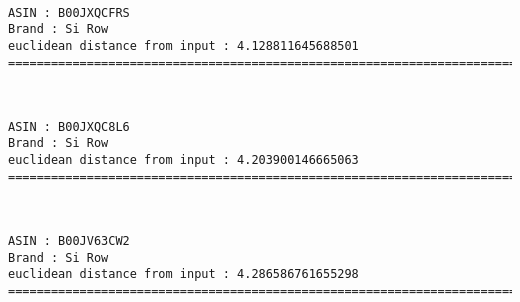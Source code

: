 \documentclass[11pt]{article}
\begin{document}
    
    
    \begin{center}
    \end{center}
    { \hspace*{\fill} \\}
    
    \begin{Verbatim}[commandchars=\\\{\}]
ASIN : B00JXQCFRS
Brand : Si Row
euclidean distance from input : 4.128811645688501
=============================================================================================================================

    \end{Verbatim}

    
    
    \begin{center}
    \end{center}
    { \hspace*{\fill} \\}
    
    \begin{Verbatim}[commandchars=\\\{\}]
ASIN : B00JXQC8L6
Brand : Si Row
euclidean distance from input : 4.203900146665063
=============================================================================================================================

    \end{Verbatim}

    
    
    \begin{center}
    \end{center}
    { \hspace*{\fill} \\}
    
    \begin{Verbatim}[commandchars=\\\{\}]
ASIN : B00JV63CW2
Brand : Si Row
euclidean distance from input : 4.286586761655298
=============================================================================================================================

    \end{Verbatim}
\end{document}
